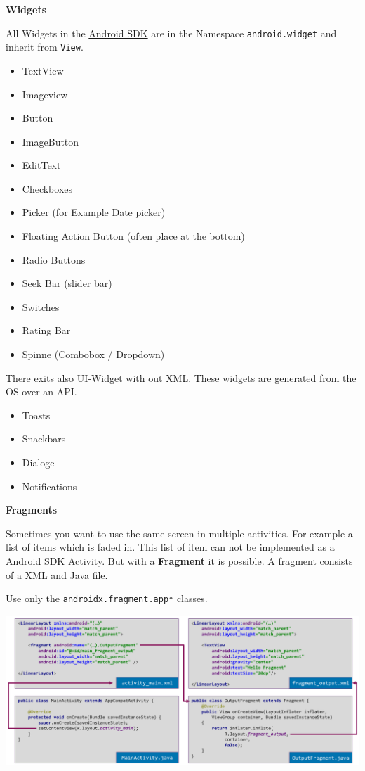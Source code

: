 \documentclass[11pt,twoside,landscape]{article}
\begin{document}
\begin{multicols}{3}
\textbf{Widgets}

All Widgets in the \href{../../../roam/20210928175951-android_sdk.org}{Android SDK} are in the Namespace \texttt{android.widget} and inherit from \texttt{View}.

\begin{itemize}
\item TextView
\item Imageview
\item Button
\item ImageButton
\item EditText
\item Checkboxes
\item Picker (for Example Date picker)
\item Floating Action Button (often place at the bottom)
\item Radio Buttons
\item Seek  Bar (slider bar)
\item Switches
\item Rating Bar
\item Spinne (Combobox / Dropdown)
\end{itemize}


There exits also UI-Widget with out XML. These widgets are generated from the OS over an API.
\begin{itemize}
\item Toasts
\item Snackbars
\item Dialoge
\item Notifications
\end{itemize}

\textbf{Fragments}

Sometimes you want to use the same screen in multiple activities.
For example a list of items which is faded in.
This list of item can not be implemented as a \href{../../../roam/20210921174424-android_sdk_activity.org}{Android SDK Activity}.
But with a \textbf{Fragment} it is possible.
A fragment consists of a XML and Java file.

Use only the \texttt{androidx.fragment.app*} classes.


\begin{center}
\includegraphics[width=.9\linewidth]{img/fragment_static_include.png}
\end{center}


\end{multicols}
\end{document}
